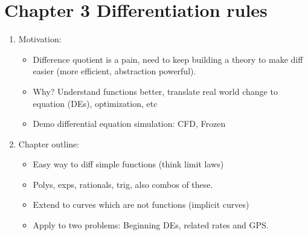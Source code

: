 \documentclass{article}
\begin{document}
\section{Chapter 3 Differentiation rules}
\begin{enumerate}
\item Motivation:
\begin{itemize}
\item Difference quotient is a pain, need to keep building a theory to make diff easier (more efficient, abstraction powerful).
\item Why? Understand functions better, translate real world change to equation (DEs), optimization, etc
\item Demo differential equation simulation: CFD, Frozen
\end{itemize}
\item Chapter outline:
\begin{itemize}
\item Easy way to diff simple functions (think limit laws)
\item Polys, exps, rationals, trig, also combos of these.
\item Extend to curves which are not functions (implicit curves)
\item Apply to two problems: Beginning DEs, related rates and GPS.
\end{itemize}
\end{enumerate}

\end{document}
